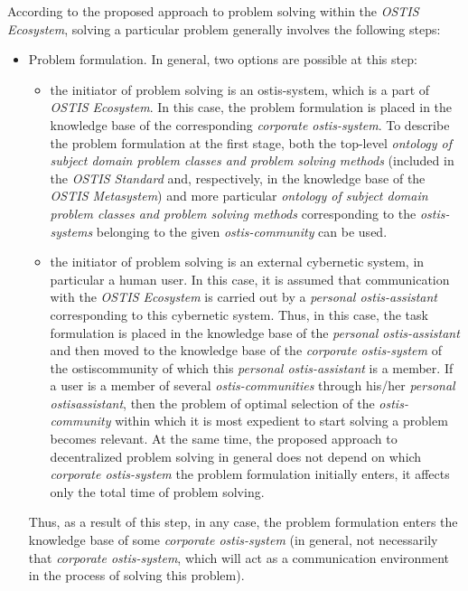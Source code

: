 \documentclass[9pt, letterpaper]{article}
\begin{document}
\begin{spacing}{0.97}
\begin{multicols}
According to the proposed approach to problem solving within the \textit{OSTIS Ecosystem}, solving a particular
problem generally involves the following steps:

\begin{itemize}
    \item Problem formulation. In general, two options are
possible at this step:
    \begin{itemize}
        \item the initiator of problem solving is an ostis-system,
which is a part of \textit{OSTIS Ecosystem}. In this
case, the problem formulation is placed in the
knowledge base of the corresponding \textit{corporate
ostis-system}. To describe the problem formulation
at the first stage, both the top-level \textit{ontology
of subject domain problem classes and problem
solving methods} (included in the \textit{OSTIS Standard}
and, respectively, in the knowledge base of the
\textit{OSTIS Metasystem}) and more particular \textit{ontology
of subject domain problem classes and problem solving methods} corresponding to the \textit{ostis-systems} belonging to the given \textit{ostis-community}
can be used.
        \item the initiator of problem solving is an external
cybernetic system, in particular a human user. In
this case, it is assumed that communication with
the \textit{OSTIS Ecosystem} is carried out by a \textit{personal
ostis-assistant} corresponding to this cybernetic
system. Thus, in this case, the task formulation
is placed in the knowledge base of the \textit{personal
ostis-assistant} and then moved to the knowledge
base of the \textit{corporate ostis-system} of the ostiscommunity of which this \textit{personal ostis-assistant}
is a member. If a user is a member of several
\textit{ostis-communities} through his/her \textit{personal ostisassistant}, then the problem of optimal selection
of the \textit{ostis-community} within which it is most
expedient to start solving a problem becomes
relevant. At the same time, the proposed approach
to decentralized problem solving in general does
not depend on which \textit{corporate ostis-system} the
problem formulation initially enters, it affects
only the total time of problem solving.
    \end{itemize}
Thus, as a result of this step, in any case, the
problem formulation enters the knowledge base of
some \textit{corporate ostis-system} (in general, not necessarily that \textit{corporate ostis-system}, which will act
as a communication environment in the process of
solving this problem).
\end{itemize}


\end{multicols}
\end{spacing}
\end{document}
